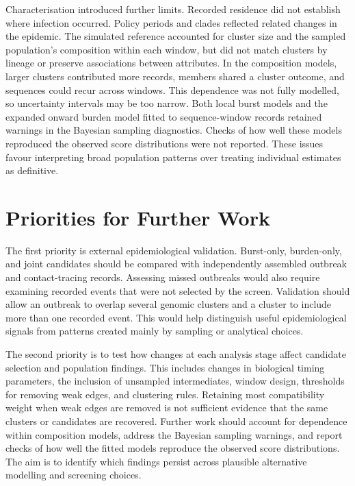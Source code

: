 Characterisation introduced further limits. Recorded residence did not establish where infection occurred. Policy periods and clades reflected related changes in the epidemic. The simulated reference accounted for cluster size and the sampled population's composition within each window, but did not match clusters by lineage or preserve associations between attributes. In the composition models, larger clusters contributed more records, members shared a cluster outcome, and sequences could recur across windows. This dependence was not fully modelled, so uncertainty intervals may be too narrow. Both local burst models and the expanded onward burden model fitted to sequence-window records retained warnings in the Bayesian sampling diagnostics. Checks of how well these models reproduced the observed score distributions were not reported. These issues favour interpreting broad population patterns over treating individual estimates as definitive.

\section{Priorities for Further Work}\label{sec:ch7_future_work}

The first priority is external epidemiological validation. Burst-only, burden-only, and joint candidates should be compared with independently assembled outbreak and contact-tracing records. Assessing missed outbreaks would also require examining recorded events that were not selected by the screen. Validation should allow an outbreak to overlap several genomic clusters and a cluster to include more than one recorded event. This would help distinguish useful epidemiological signals from patterns created mainly by sampling or analytical choices.

The second priority is to test how changes at each analysis stage affect candidate selection and population findings. This includes changes in biological timing parameters, the inclusion of unsampled intermediates, window design, thresholds for removing weak edges, and clustering rules. Retaining most compatibility weight when weak edges are removed is not sufficient evidence that the same clusters or candidates are recovered. Further work should account for dependence within composition models, address the Bayesian sampling warnings, and report checks of how well the fitted models reproduce the observed score distributions. The aim is to identify which findings persist across plausible alternative modelling and screening choices.

